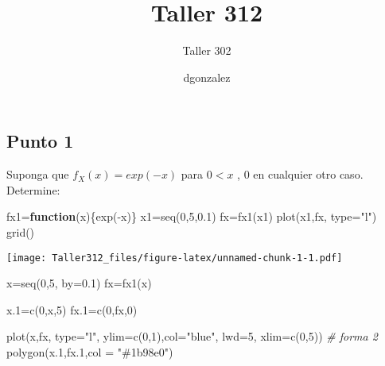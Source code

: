 \documentclass[
]{article}
\title{Taller 312}
\subtitle{Taller 302}
\author{dgonzalez}
\date{}
\newenvironment{Shaded}{\begin{snugshade}}{\end{snugshade}}
\newcommand{\AttributeTok}[1]{\textcolor[rgb]{0.77,0.63,0.00}{#1}}
\newcommand{\CommentTok}[1]{\textcolor[rgb]{0.56,0.35,0.01}{\textit{#1}}}
\newcommand{\ControlFlowTok}[1]{\textcolor[rgb]{0.13,0.29,0.53}{\textbf{#1}}}
\newcommand{\DecValTok}[1]{\textcolor[rgb]{0.00,0.00,0.81}{#1}}
\newcommand{\FloatTok}[1]{\textcolor[rgb]{0.00,0.00,0.81}{#1}}
\newcommand{\FunctionTok}[1]{\textcolor[rgb]{0.00,0.00,0.00}{#1}}
\newcommand{\NormalTok}[1]{#1}
\newcommand{\OtherTok}[1]{\textcolor[rgb]{0.56,0.35,0.01}{#1}}
\newcommand{\SpecialCharTok}[1]{\textcolor[rgb]{0.00,0.00,0.00}{#1}}
\newcommand{\StringTok}[1]{\textcolor[rgb]{0.31,0.60,0.02}{#1}}
\begin{document}
\maketitle

{
\setcounter{tocdepth}{2}
\tableofcontents
}
\hypertarget{punto-1}{%
\subsection{Punto 1}\label{punto-1}}

Suponga que \(f_X(x)=exp(-x)\) para \(0<x\) , \(0\) en cualquier otro
caso. Determine:

\begin{Shaded}
\begin{Highlighting}[]
\NormalTok{fx1}\OtherTok{=}\ControlFlowTok{function}\NormalTok{(x)\{}\FunctionTok{exp}\NormalTok{(}\SpecialCharTok{{-}}\NormalTok{x)\}}
\NormalTok{x1}\OtherTok{=}\FunctionTok{seq}\NormalTok{(}\DecValTok{0}\NormalTok{,}\DecValTok{5}\NormalTok{,}\FloatTok{0.1}\NormalTok{)}
\NormalTok{fx}\OtherTok{=}\FunctionTok{fx1}\NormalTok{(x1)}
\FunctionTok{plot}\NormalTok{(x1,fx, }\AttributeTok{type=}\StringTok{"l"}\NormalTok{)}
\FunctionTok{grid}\NormalTok{()}
\end{Highlighting}
\end{Shaded}

\texttt{[image: Taller312\_files/figure-latex/unnamed-chunk-1-1.pdf]}

\begin{Shaded}
\begin{Highlighting}[]
\NormalTok{x}\OtherTok{=}\FunctionTok{seq}\NormalTok{(}\DecValTok{0}\NormalTok{,}\DecValTok{5}\NormalTok{, }\AttributeTok{by=}\FloatTok{0.1}\NormalTok{)}
\NormalTok{fx}\OtherTok{=}\FunctionTok{fx1}\NormalTok{(x)}

\NormalTok{x}\FloatTok{.1}\OtherTok{=}\FunctionTok{c}\NormalTok{(}\DecValTok{0}\NormalTok{,x,}\DecValTok{5}\NormalTok{)}
\NormalTok{fx}\FloatTok{.1}\OtherTok{=}\FunctionTok{c}\NormalTok{(}\DecValTok{0}\NormalTok{,fx,}\DecValTok{0}\NormalTok{)}

\FunctionTok{plot}\NormalTok{(x,fx, }\AttributeTok{type=}\StringTok{"l"}\NormalTok{, }\AttributeTok{ylim=}\FunctionTok{c}\NormalTok{(}\DecValTok{0}\NormalTok{,}\DecValTok{1}\NormalTok{),}\AttributeTok{col=}\StringTok{"blue"}\NormalTok{, }\AttributeTok{lwd=}\DecValTok{5}\NormalTok{, }\AttributeTok{xlim=}\FunctionTok{c}\NormalTok{(}\DecValTok{0}\NormalTok{,}\DecValTok{5}\NormalTok{)) }\CommentTok{\# forma 2}
\FunctionTok{polygon}\NormalTok{(x}\FloatTok{.1}\NormalTok{,fx}\FloatTok{.1}\NormalTok{,}\AttributeTok{col =} \StringTok{"\#1b98e0"}\NormalTok{) }
\end{Highlighting}
\end{Shaded}
\end{document}
